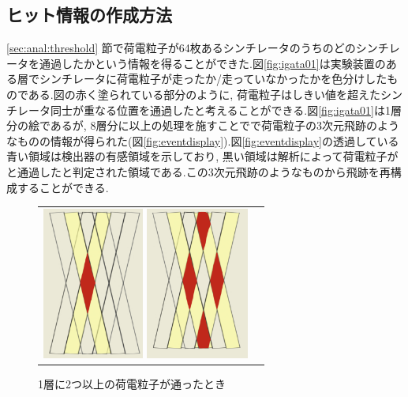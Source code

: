 \subsection{ヒット情報の作成方法}\label{subsec:anal:make_hit}
\ref{sec:anal:threshold} 節で荷電粒子が64枚あるシンチレータのうちのどのシンチレータを通過したかという情報を得ることができた.図\ref{fig:igata01}は実験装置のある層でシンチレータに荷電粒子が走ったか/走っていなかったかを色分けしたものである.図の赤く塗られている部分のように, 荷電粒子はしきい値を超えたシンチレータ同士が重なる位置を通過したと考えることができる.図\ref{fig:igata01}は1層分の絵であるが, 8層分に以上の処理を施すことでで荷電粒子の3次元飛跡のようなものの情報が得られた(図\ref{fig:eventdisplay}).図\ref{fig:eventdisplay}の透過している青い領域は検出器の有感領域を示しており, 黒い領域は解析によって荷電粒子がと通過したと判定された領域である.この3次元飛跡のようなものから飛跡を再構成することができる.
\begin{figure}[H]
    \begin{tabular}{cc}
        \begin{minipage}[t]{0.45\hsize}
            \centering
            \includegraphics[height=5.0cm]{img/igata_01.png}
            \caption{1層分のシンチレータ}
            \label{fig:igata01}
        \end{minipage}
        \begin{minipage}[t]{0.45\hsize}
            \centering
            \includegraphics[height=5.0cm]{img/igata_02.png}
            \caption{1層に2つ以上の荷電粒子が通ったとき}
            \label{fig:igata02}
        \end{minipage}
    \end{tabular}
\end{figure}
